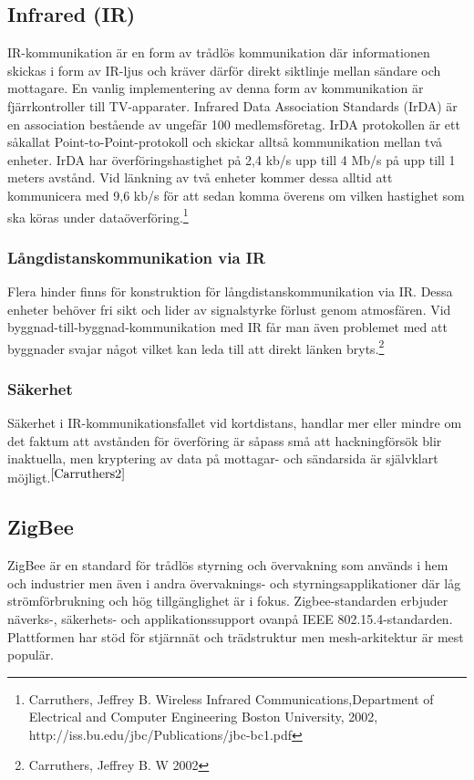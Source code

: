 \documentclass[a4paper,12pt,fleqn]{article}
\begin{document}
\subsection{Infrared (IR)}
IR-kommunikation är en form av trådlös kommunikation där informationen skickas i form av IR-ljus och kräver därför direkt siktlinje mellan sändare och mottagare. En vanlig implementering av denna form av kommunikation är fjärrkontroller till TV-apparater.
Infrared Data Association Standards (IrDA) är en association bestående av ungefär 100 medlemsföretag. IrDA protokollen är ett såkallat Point-to-Point-protokoll och skickar alltså kommunikation mellan två enheter. IrDA har överföringshastighet på 2,4 kb/s upp till 4 Mb/s på upp till 1 meters avstånd. Vid länkning av två enheter kommer dessa alltid att kommunicera med 9,6 kb/s för att sedan komma överens om vilken hastighet som ska köras under dataöverföring.\footnote{\label{Carruthers}Carruthers, Jeffrey B. Wireless Infrared Communications,Department of Electrical and Computer Engineering
Boston University, 2002, http://iss.bu.edu/jbc/Publications/jbc-bc1.pdf}  
\newpage
\subsubsection{Långdistanskommunikation via IR}
Flera hinder finns för konstruktion för långdistanskommunikation via IR. Dessa enheter behöver fri sikt och lider av signalstyrke förlust genom atmosfären. Vid byggnad-till-byggnad-kommunikation med IR får man även problemet med att byggnader svajar något vilket kan leda till att direkt länken bryts.\footnote{\label{Carruthers2}Carruthers, Jeffrey B. W 2002}

\subsubsection{Säkerhet}
Säkerhet i IR-kommunikationsfallet vid kortdistans, handlar mer eller mindre om det faktum att avstånden för överföring är såpass små att hackningförsök blir inaktuella, men kryptering av data på mottagar- och sändarsida är självklart möjligt.$^{\ref{Carruthers2}}$
\newpage
\subsection{ZigBee}
ZigBee är en standard för trådlös styrning och övervakning som används i hem och industrier men även i andra övervaknings- och styrningsapplikationer där låg strömförbrukning och hög tillgänglighet är i fokus. Zigbee-standarden erbjuder näverks-, säkerhets- och applikationssupport ovanpå IEEE 802.15.4-standarden. Plattformen har stöd för stjärnnät och trädstruktur men mesh-arkitektur är mest populär.
\end{document}
